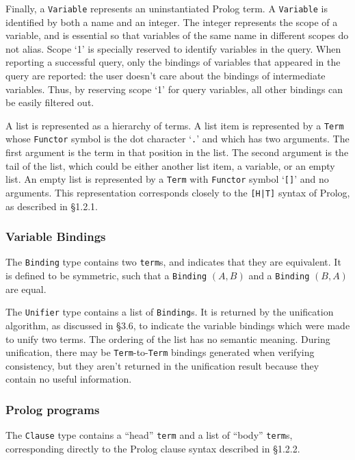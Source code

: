 \documentclass[12pt]{article}
\begin{document}
Finally, a \verb|Variable| represents an uninstantiated Prolog term. 
A \verb|Variable| is identified by both a name and an integer. 
The integer represents the scope of a variable, and is essential so that variables of the same name in different scopes do not alias. 
Scope `1' is specially reserved to identify variables in the query. 
When reporting a successful query, only the bindings of variables that appeared in the query are reported: the user doesn't care about the bindings of intermediate variables.
Thus, by reserving scope `1' for query variables, all other bindings can be easily filtered out.

A list is represented as a hierarchy of terms. 
A list item is represented by a \verb|Term| whose \verb|Functor| symbol is the dot character `\verb|.|' and which has two arguments. 
The first argument is the term in that position in the list. 
The second argument is the tail of the list, which could be either another list item, a variable, or an empty list.
An empty list is represented by a \verb|Term| with \verb|Functor| symbol `\verb|[]|' and no arguments. 
This representation corresponds closely to the \verb/[H|T]/ syntax of Prolog, as described in \S1.2.1.

\subsubsection{Variable Bindings}

The \verb|Binding| type contains two \verb|term|s, and indicates that they are equivalent. 
It is defined to be symmetric, such that a \verb|Binding| $(A,B)$ and a \verb|Binding| $(B,A)$ are equal.

The \verb|Unifier| type contains a list of \verb|Binding|s. 
It is returned by the unification algorithm, as discussed in \S3.6, to indicate the variable bindings which were made to unify two terms. 
The ordering of the list has no semantic meaning.
During unification, there may be \verb|Term|-to-\verb|Term| bindings generated when verifying consistency, but they aren't returned in the unification result because they contain no useful information.

\subsubsection{Prolog programs}

The \verb|Clause| type contains a ``head'' \verb|term| and a list of ``body'' \verb|term|s, corresponding directly to the Prolog clause syntax described in \S1.2.2.
\end{document}
